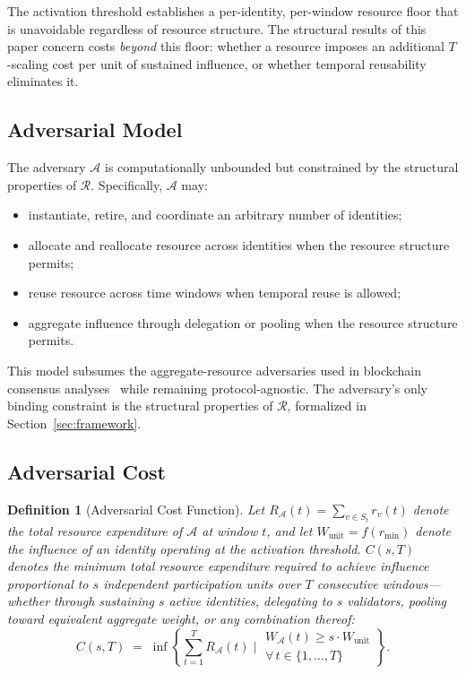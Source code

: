 \documentclass[10pt,journal,compsoc]{IEEEtran}
\newtheorem{definition}[theorem]{Definition}
\theoremstyle{remark}
\begin{document}
	The activation threshold establishes a per-identity,
	per-window resource floor that is unavoidable regardless
	of resource structure.
	The structural results of this paper concern costs
	\emph{beyond} this floor: whether a resource imposes
	an additional $T$-scaling cost per unit of sustained
	influence, or whether temporal reusability eliminates it.
	
	\subsection{Adversarial Model}
	\label{ssec:adversary}
	
	The adversary $\mathcal{A}$ is computationally
	unbounded but constrained by the structural
	properties of $\mathcal{R}$.
	Specifically, $\mathcal{A}$ may:
	\begin{itemize}
		\item instantiate, retire, and coordinate
		an arbitrary number of identities;
		\item allocate and reallocate resource across
		identities when the resource structure permits;
		\item reuse resource across time windows when
		temporal reuse is allowed;
		\item aggregate influence through delegation
		or pooling when the resource structure permits.
	\end{itemize}
	
	This model subsumes the aggregate-resource adversaries
	used in blockchain consensus
	analyses~\cite{garay2015backbone,kiayias2017ouroboros}
	while remaining protocol-agnostic.
	The adversary's only binding constraint is the
	structural properties of $\mathcal{R}$, formalized
	in Section~\ref{sec:framework}.
	
	\subsection{Adversarial Cost}
	\label{ssec:cost}
	
	\begin{definition}[Adversarial Cost Function]
		\label{def:cost}
		Let $R_{\mathcal{A}}(t) = \sum_{v \in S_t} r_v(t)$
		denote the total resource expenditure of $\mathcal{A}$
		at window $t$, and let $W_{\mathrm{unit}} = f(r_{\min})$
		denote the influence of an identity operating at the
		activation threshold.
		$C(s, T)$ denotes the minimum total resource
		expenditure required to achieve influence proportional
		to $s$ independent participation units over $T$
		consecutive windows---whether through sustaining
		$s$ active identities, delegating to $s$ validators,
		pooling toward equivalent aggregate weight, or any
		combination thereof:
		\begin{equation}
			C(s, T) \;=\; \inf \left\{
			\sum_{t=1}^{T} R_{\mathcal{A}}(t)
			\;\Bigg|\;
			\begin{array}{l}
				W_{\mathcal{A}}(t) \geq s \cdot W_{\mathrm{unit}} \\[3pt]
				\forall\, t \in \{1,\ldots,T\}
			\end{array}
			\right\}.
		\end{equation}
	\end{definition}
	
\end{document}
